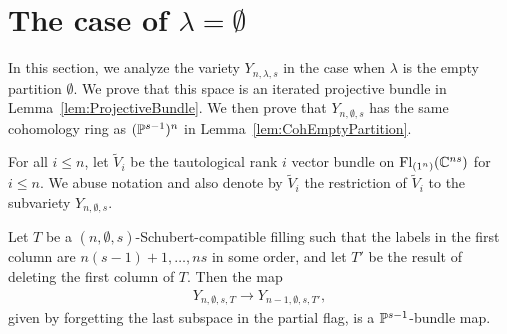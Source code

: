\documentclass[12pt]{amsart}
\newcommand{\Fl}{\mathrm{Fl}}
\newcommand{\la}{\lambda}
\begin{document}
%
%





\section{The case of $\lambda = \emptyset$}\label{sec:EmptyPartition}

In this section, we analyze the variety $Y_{n,\lambda,s}$ in the case when $\lambda$ is the empty partition $\emptyset$. We prove that this space is an iterated projective bundle in Lemma~\ref{lem:ProjectiveBundle}. We then prove that $Y_{n,\emptyset,s}$ has the same cohomology ring as $(\mathbb{P}^{s-1})^n$ in Lemma~\ref{lem:CohEmptyPartition}.

For all $i\leq n$, let $\widetilde V_i$ be the tautological rank $i$ vector bundle on $\Fl_{(1^n)}(\bC^{ns})$ for $i\leq n$. We abuse notation and also denote by $\widetilde V_i$ the restriction of $\widetilde V_i$ to the subvariety $Y_{n,\emptyset,s}$. 

\begin{lemma}\label{lem:ProjectiveBundle}
Let $T$ be a $(n,\emptyset,s)$-Schubert-compatible filling such that the labels in the first column are $n(s-1)+1,\dots, ns$ in some order, and let $T'$ be the result of deleting the first column of $T$. Then the map
\begin{align}\label{eq:ForgettingMap}
Y_{n,\emptyset,s,T} \rightarrow Y_{n-1,\emptyset,s,T'},
\end{align}
given by forgetting the last subspace in the partial flag, is a $\mathbb{P}^{s-1}$-bundle map.
\end{lemma}
\end{document}
